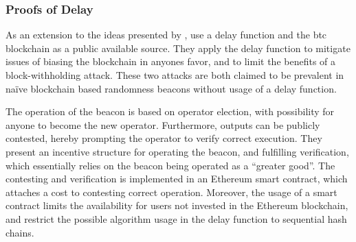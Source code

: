 \subsubsection{Proofs of Delay}%
\label{ssub:proofs_of_delay}

As an extension to the ideas presented by \citet{randomzoo}, \citet{bunz2017proofsof} use a delay function and the \gls{btc} blockchain as a public available source.
They apply the delay function to mitigate issues of biasing the blockchain in anyones favor, and to limit the benefits of a block-withholding attack.
These two attacks are both claimed to be prevalent in naïve blockchain based randomness beacons without usage of a delay function.

The operation of the beacon is based on operator election, with possibility for anyone to become the new operator.
Furthermore, outputs can be publicly contested, hereby prompting the operator to verify correct execution.
They present an incentive structure for operating the beacon, and fulfilling verification, which essentially relies on the beacon being operated as a \enquote{greater good}.
The contesting and verification is implemented in an Ethereum smart contract, which attaches a cost to contesting correct operation.
Moreover, the usage of a smart contract limits the availability for users not invested in the Ethereum blockchain, and restrict the possible algorithm usage in the delay function to sequential hash chains.

